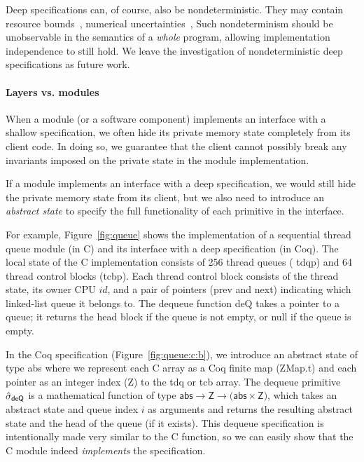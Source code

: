 Deep specifications can, of course, also be nondeterministic. They may
contain resource bounds~\cite{veristack}, numerical
uncertainties~\cite{chaudhuri10}, {\etc}
 Such nondeterminism should
be unobservable in the semantics of a {\em whole} program,
allowing implementation independence to still hold.  We leave the
investigation of nondeterministic deep specifications as future work.


\paragraph{Layers vs. modules} 
When a module (or a software component)
implements an interface with a shallow specification, 
we often hide its private memory state completely
from its client code. In doing so, we guarantee that the client
cannot possibly break any invariants imposed on the private state
in the module implementation.

If a module implements an interface with a deep specification, we
would still hide the private memory state from its client, but we also
need to introduce an {\em abstract state} to specify
the full functionality of each primitive in the interface. 

For example, Figure~\ref{fig:queue} shows the implementation of a
sequential thread queue module (in C) and its interface with a deep
specification (in Coq). The local state of the C implementation
consists of 256 thread queues (%
\textsf{tdqp}) and 64 thread control blocks
(\textsf{tcbp}).  Each thread control block consists of the thread state, its owner CPU $id$,
and a pair of pointers (\textsf{prev} and \textsf{next}) indicating which
linked-list queue it belongs to. The dequeue  function 
\textsf{deQ}
takes a pointer to a queue; it returns the head block if the queue
is not empty, or null if the queue is empty.

In the Coq specification (\cf Figure~\ref{fig:queue:c:b}), we introduce an abstract state
of type \textsf{abs} where we represent each C array as a Coq finite map
(\textsf{ZMap.t}) and each pointer as an integer index (\textsf{Z}) to the
\textsf{tdq} or \textsf{tcb} array. The dequeue primitive 
$\hat{\sigma}_\textsf{deQ}$ is
a mathematical function of type $\textsf{abs} \rightarrow \textsf{Z}
\rightarrow \textsf{(abs}\times \textsf{Z)}$,
which takes an abstract state and queue index $i$ as arguments
and returns the resulting abstract state and the head of the queue (if it exists).  This
dequeue specification is intentionally made very similar to the C
function, so we can easily show that the C module indeed {\em
  implements} the specification. 

